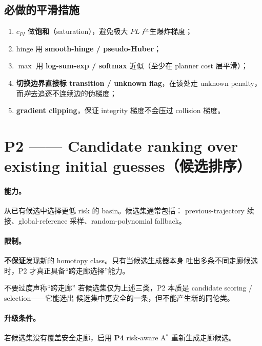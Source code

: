 \documentclass[11pt]{ctexart}
\begin{document}
\subsection{必做的平滑措施}
\begin{enumerate}
\item $c_{PI}$ 做\textbf{饱和}（saturation），避免极大 $PL$ 产生爆炸梯度；
\item hinge 用 \textbf{smooth-hinge / pseudo-Huber}；
\item $\max$ 用 \textbf{log-sum-exp / softmax} 近似（至少在 planner cost 层平滑）；
\item \textbf{切换边界直接标 transition / unknown flag}，在该处走 unknown penalty，
  而\emph{非}去追逐不连续边的伪梯度；
\item \textbf{gradient clipping}，保证 integrity 梯度不会压过 collision 梯度。
\end{enumerate}

\section{P2 —— Candidate ranking over existing initial guesses（候选排序）}

\paragraph{能力。}从已有候选中选择更低 risk 的 basin。候选集通常包括：
previous-trajectory 续接、global-reference 采样、random-polynomial fallback。

\paragraph{限制。}\textbf{不保证}发现新的 homotopy class。只有当候选生成器本身
吐出多条不同走廊候选时，P2 才真正具备``跨走廊选择''能力。

\begin{warnbox}{不要过度声称``跨走廊''}
若候选集仅为上述三类，P2 本质是 candidate scoring / selection——它能选出
候选集中更安全的一条，但不能产生新的同伦类。
\end{warnbox}

\paragraph{升级条件。}若候选集没有覆盖安全走廊，启用 \textbf{P4} risk-aware A$^\ast$
重新生成走廊候选。
\end{document}
